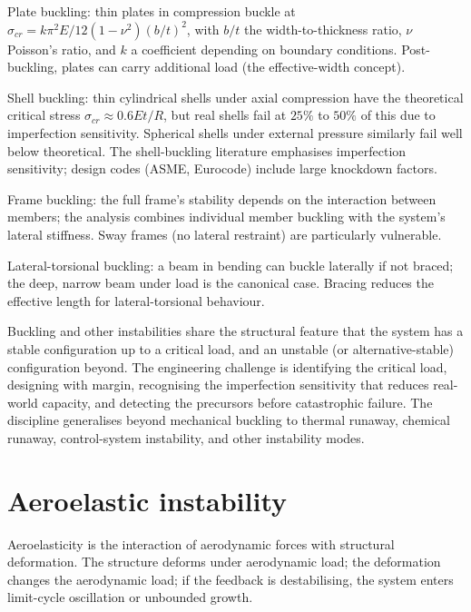 Plate buckling: thin plates in compression buckle at $\sigma_{cr} = k \pi^2 E / 12(1-\nu^2)(b/t)^2$, with $b/t$ the width-to-thickness ratio, $\nu$ Poisson's ratio, and $k$ a coefficient depending on boundary conditions. Post-buckling, plates can carry additional load (the effective-width concept).

Shell buckling: thin cylindrical shells under axial compression have the theoretical critical stress $\sigma_{cr} \approx 0.6 E t / R$, but real shells fail at $25\%$ to $50\%$ of this due to imperfection sensitivity. Spherical shells under external pressure similarly fail well below theoretical. The shell-buckling literature emphasises imperfection sensitivity; design codes (ASME, Eurocode) include large knockdown factors.

Frame buckling: the full frame's stability depends on the interaction between members; the analysis combines individual member buckling with the system's lateral stiffness. Sway frames (no lateral restraint) are particularly vulnerable.

Lateral-torsional buckling: a beam in bending can buckle laterally if not braced; the deep, narrow beam under load is the canonical case. Bracing reduces the effective length for lateral-torsional behaviour.

\begin{archetype}
Buckling and other instabilities share the structural feature that the system has a stable configuration up to a critical load, and an unstable (or alternative-stable) configuration beyond. The engineering challenge is identifying the critical load, designing with margin, recognising the imperfection sensitivity that reduces real-world capacity, and detecting the precursors before catastrophic failure. The discipline generalises beyond mechanical buckling to thermal runaway, chemical runaway, control-system instability, and other instability modes.
\end{archetype}

\section{Aeroelastic instability}

Aeroelasticity is the interaction of aerodynamic forces with structural deformation. The structure deforms under aerodynamic load; the deformation changes the aerodynamic load; if the feedback is destabilising, the system enters limit-cycle oscillation or unbounded growth.

